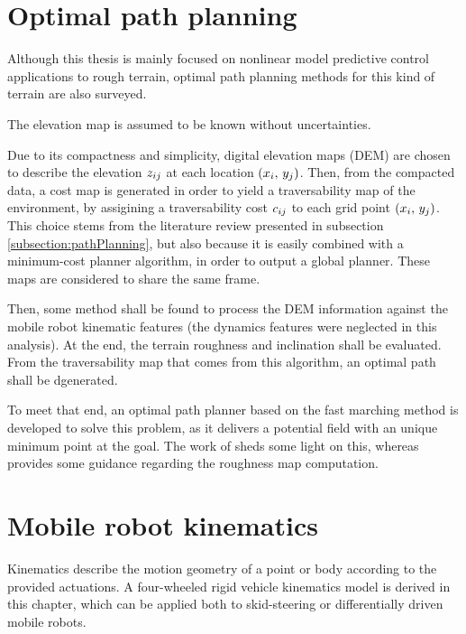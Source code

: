 \section{Optimal path planning}
\label{section:approachOptimalPathPlanning}

Although this thesis is mainly focused on nonlinear model predictive control applications to rough terrain, optimal path planning methods for this kind of terrain are also surveyed.

\begin{assumption}
	The elevation map is assumed to be known  without uncertainties.
	\label{assumption:elevationmap}
\end{assumption}

Due to its compactness and simplicity, digital elevation maps (DEM) are chosen to describe the elevation $z_{ij}$ at each location $(x_i,\, y_j)$. Then, from the compacted data, a cost map is generated in order to yield a traversability map  of the environment, by assigining a traversability cost $c_{ij}$ to each grid point $(x_i,\, y_j)$. This choice stems from the literature review presented in subsection \ref{subsection:pathPlanning}, but also because it is easily combined with a minimum-cost planner algorithm, in order to output a global planner. These maps are considered to share the same frame.

Then, some method shall be found to process the DEM information against the mobile robot kinematic features (the dynamics features were neglected in this analysis). At the end, the terrain roughness and inclination shall be evaluated. From the traversability map that comes from this algorithm, an optimal path shall be dgenerated.

To meet that end, an optimal path planner based on the fast marching method is developed to solve this problem, as it delivers a potential field with an unique minimum point at the goal. The work of \citet{Amorim2014} sheds some light on this, whereas \citet{Ishigami2007PathPlanning} provides some guidance regarding the roughness map computation.

\section{Mobile robot kinematics}
\label{section:robotkinematics}

Kinematics describe the motion geometry of a point or body according to the provided actuations. A four-wheeled rigid vehicle kinematics model is derived in this chapter, which can be applied both to skid-steering or differentially driven mobile robots.

